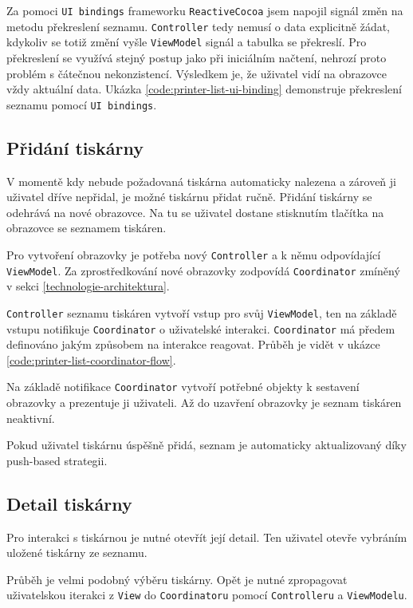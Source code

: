 Za pomoci \texttt{UI bindings} frameworku \texttt{ReactiveCocoa} jsem napojil signál změn na metodu překreslení seznamu.
\texttt{Controller} tedy nemusí o data explicitně žádat, kdykoliv se totiž změní vyšle \texttt{ViewModel} signál a tabulka se překreslí.
Pro překreslení se využívá stejný postup jako při iniciálním načtení, nehrozí proto problém s čátečnou nekonzistencí.
Výsledkem je, že uživatel vidí na obrazovce vždy aktuální data.
Ukázka \ref{code:printer-list-ui-binding} demonstruje překreslení seznamu pomocí \texttt{UI bindings}.


\subsection{Přidání tiskárny}

V momentě kdy nebude požadovaná tiskárna automaticky nalezena a zároveň ji uživatel dříve nepřidal, je možné tiskárnu přidat ručně.
Přidání tiskárny se odehrává na nové obrazovce.
Na tu se uživatel dostane stisknutím tlačítka \uv{+} na obrazovce se seznamem tiskáren.

Pro vytvoření obrazovky je potřeba nový \texttt{Controller} a k němu odpovídající \texttt{ViewModel}.
Za zprostředkování nové obrazovky zodpovídá \texttt{Coordinator} zmíněný v sekci \ref{technologie-architektura}.

\texttt{Controller} seznamu tiskáren vytvoří vstup pro svůj \texttt{ViewModel}, ten na základě vstupu notifikuje \texttt{Coordinator} o uživatelské interakci.
\texttt{Coordinator} má předem definováno jakým způsobem na interakce reagovat.
Průběh je vidět v ukázce \ref{code:printer-list-coordinator-flow}.

Na základě notifikace \texttt{Coordinator} vytvoří potřebné objekty k sestavení obrazovky a prezentuje ji uživateli.
Až do uzavření obrazovky je seznam tiskáren neaktivní.

Pokud uživatel tiskárnu úspěšně přidá, seznam je automaticky aktualizovaný díky push-based strategii.


\subsection{Detail tiskárny}

Pro interakci s tiskárnou je nutné otevřít její detail.
Ten uživatel otevře vybráním uložené tiskárny ze seznamu.

Průběh je velmi podobný výběru tiskárny.
Opět je nutné zpropagovat uživatelskou iterakci z \texttt{View} do \texttt{Coordinatoru} pomocí \texttt{Controlleru} a \texttt{ViewModelu}.
